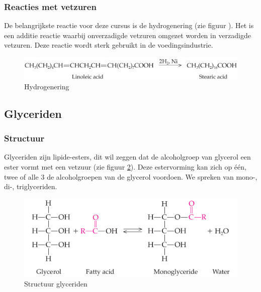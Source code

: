 \documentclass[a4paper,kul]{kulakarticle} %
\begin{document}
\subsubsection{Reacties met vetzuren}
De belangrijkste reactie voor deze cursus is de hydrogenering (zie figuur ). Het is een additie reactie waarbij onverzadigde vetzuren omgezet worden in verzadigde vetzuren. Deze reactie wordt sterk gebruikt in de voedingsindustrie.
\begin{figure}[h]
	\centering
	\includegraphics[width=0.7\linewidth]{hydrogenering}
	\caption[Hydrogenering]{Hydrogenering}
	\label{fig:hydrogenering}
\end{figure}
\subsection{Glyceriden}
\subsubsection{Structuur}
Glyceriden zijn lipide-esters, dit wil zeggen dat de alcoholgroep van glycerol een ester vormt met een vetzuur (zie figuur \ref{fig:structuurglyceriden}). Deze estervorming kan zich op één, twee of alle 3 de alcoholgroepen van de glycerol voordoen. We spreken van mono-, di-, triglyceriden.
\begin{figure}[h]
	\centering
	\includegraphics[width=0.6\linewidth]{structuur_glyceriden}
	\caption[Structuur glyceriden]{Structuur glyceriden}
	\label{fig:structuurglyceriden}
\end{figure}
\end{document}
